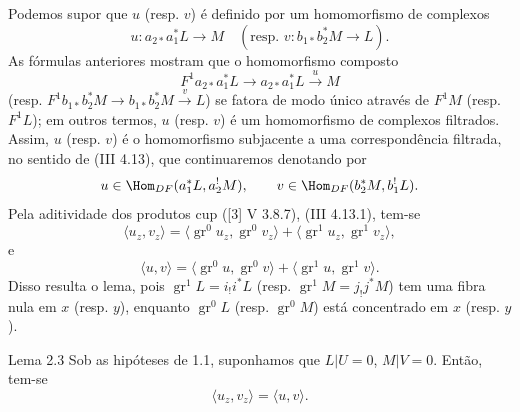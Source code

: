 Podemos supor que $u$ (resp. $v$) é definido por um homomorfismo de complexos
\[
u:a_{2*}a_1^*L\longrightarrow M
\quad
(\text{resp. }v:b_{1*}b_2^*M\longrightarrow L).
\]
As fórmulas anteriores mostram que o homomorfismo composto
\[
F^1a_{2*}a_1^*L\longrightarrow a_{2*}a_1^*L\xrightarrow{u}M
\]
(resp. $F^1b_{1*}b_2^*M\to b_{1*}b_2^*M\xrightarrow{v}L$) se fatora de modo único através de $F^1M$ (resp. $F^1L$); em outros termos, $u$ (resp. $v$) é um homomorfismo de complexos filtrados. Assim, $u$ (resp. $v$) é o homomorfismo subjacente a uma correspondência filtrada, no sentido de (III 4.13), que continuaremos denotando por
\[
u\in\Hom_{DF}(a_1^*L,a_2^!M),\qquad
v\in\Hom_{DF}(b_2^*M,b_1^!L).
\]
Pela aditividade dos produtos cup ([3] V 3.8.7), (III 4.13.1), tem-se
\[
\langle u_z,v_z\rangle
 =\langle \operatorname{gr}^0u_z,\operatorname{gr}^0v_z\rangle
 +\langle \operatorname{gr}^1u_z,\operatorname{gr}^1v_z\rangle,
\]
e
\[
\langle u,v\rangle
 =\langle \operatorname{gr}^0u,\operatorname{gr}^0v\rangle
 +\langle \operatorname{gr}^1u,\operatorname{gr}^1v\rangle.
\]
Disso resulta o lema, pois $\operatorname{gr}^1L=i_!i^*L$ (resp. $\operatorname{gr}^1M=j_!j^*M$) tem uma fibra nula em $x$ (resp. $y$), enquanto $\operatorname{gr}^0L$ (resp. $\operatorname{gr}^0M$) está concentrado em $x$ (resp. $y$).

\begin{statement}{Lema 2.3}
Sob as hipóteses de 1.1, suponhamos que $L|U=0$, $M|V=0$. Então, tem-se
\[
\langle u_z,v_z\rangle=\langle u,v\rangle .
\]
\end{statement}
